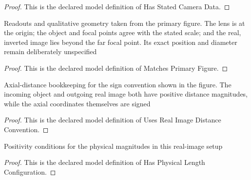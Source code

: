 \begin{proof}
  This is the declared model definition of Has Stated Camera Data.
\end{proof}
\begin{definition}
  \label{def:physics:phyx-mini-0159:phyxminiproblems-problemphyxmini0159-matchesprimaryfigure}
  Readouts and qualitative geometry taken from the primary figure. The lens is at the origin; the object and focal points agree with the stated scale; and the real, inverted image lies beyond the far focal point. Its exact position and diameter remain deliberately unspecified
\end{definition}
\begin{proof}
  This is the declared model definition of Matches Primary Figure.
\end{proof}
\begin{definition}
  \label{def:physics:phyx-mini-0159:phyxminiproblems-problemphyxmini0159-usesrealimagedistanceconvention}
  Axial-distance bookkeeping for the sign convention shown in the figure. The incoming object and outgoing real image both have positive distance magnitudes, while the axial coordinates themselves are signed
\end{definition}
\begin{proof}
  This is the declared model definition of Uses Real Image Distance Convention.
\end{proof}
\begin{definition}
  \label{def:physics:phyx-mini-0159:phyxminiproblems-problemphyxmini0159-hasphysicallengthconfiguration}
  Positivity conditions for the physical magnitudes in this real-image setup
\end{definition}
\begin{proof}
  This is the declared model definition of Has Physical Length Configuration.
\end{proof}
